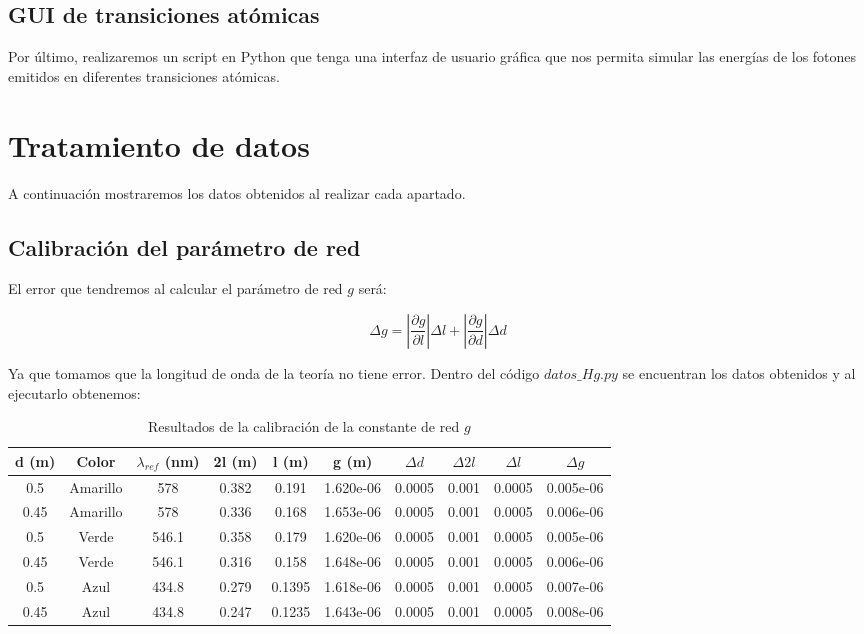\documentclass[11pt, a4paper, twocolumn]{article}
\begin{document}
\subsection{GUI de transiciones atómicas}

Por último, realizaremos un script en Python que tenga una interfaz de 
usuario gráfica que nos permita simular las energías de los fotones emitidos 
en diferentes transiciones atómicas.

\section{Tratamiento de datos}

A continuación mostraremos los datos obtenidos al realizar cada apartado.

\subsection{Calibración del parámetro de red}

El error que tendremos al calcular el parámetro de red $g$ será:

\begin{equation}
   \Delta g = \left|  \frac{\partial g}{\partial l}\right| \Delta l + \left|  \frac{\partial g}{\partial d}\right| \Delta d
\end{equation}

Ya que tomamos que la longitud de onda de la teoría no tiene error. 
Dentro del código $datos\_Hg.py$ se encuentran los datos obtenidos y al ejecutarlo 
obtenemos:

\begin{table}
	\begin{tabular}{cccccccccc}
\hline
   d (m) & Color    &   $\lambda_{ref}$ (nm) &   2l (m) &   l (m) &       g (m) &   $\Delta d$ &   $\Delta 2l$ &   $\Delta l$ & $\Delta g$\\
\hline
    0.5  & Amarillo &             578   &    0.382 &  0.191  & 1.620e-06 &    0.0005 &      0.001 &    0.0005 & 0.005e-06 \\
    0.45 & Amarillo &             578   &    0.336 &  0.168  & 1.653e-06 &    0.0005 &      0.001 &    0.0005 & 0.006e-06 \\
    0.5  & Verde    &             546.1 &    0.358 &  0.179  & 1.620e-06 &    0.0005 &      0.001 &    0.0005 & 0.005e-06 \\
    0.45 & Verde    &             546.1 &    0.316 &  0.158  & 1.648e-06 &    0.0005 &      0.001 &    0.0005 & 0.006e-06 \\
    0.5  & Azul     &             434.8 &    0.279 &  0.1395 & 1.618e-06 &    0.0005 &      0.001 &    0.0005 & 0.007e-06 \\
    0.45 & Azul     &             434.8 &    0.247 &  0.1235 & 1.643e-06 &    0.0005 &      0.001 &    0.0005 & 0.008e-06 \\
\hline
\end{tabular}
\caption{Resultados de la calibración de la constante de red $g$}

\label{tab: TablagHg}
\end{table}
\end{document}
